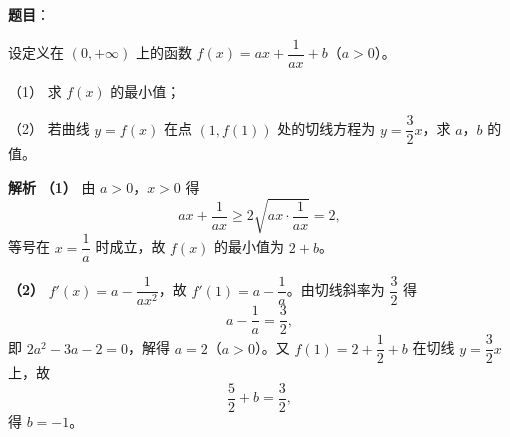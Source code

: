 \begin{answer}

\textbf{题目}：

设定义在 $(0,+\infty)$ 上的函数 $f(x)=ax+\dfrac1{ax}+b$（$a>0$）。

（1） 求 $f(x)$ 的最小值；

（2） 若曲线 $y=f(x)$ 在点 $(1,f(1))$ 处的切线方程为 $y=\dfrac32x$，求 $a$，$b$ 的值。

\textbf{解析}
\textbf{（1）} 由 $a>0$，$x>0$ 得
\nopagebreak[4]
\[ax+\frac1{ax}\geqslant2\sqrt{ax\cdot\frac1{ax}}=2,\]
等号在 $x=\dfrac1a$ 时成立，故 $f(x)$ 的最小值为 $2+b$。

\textbf{（2）} $f'(x)=a-\dfrac1{ax^2}$，故 $f'(1)=a-\dfrac1a$。由切线斜率为 $\dfrac32$ 得
\nopagebreak[4]
\[a-\frac1a=\frac32,\]
即 $2a^2-3a-2=0$，解得 $a=2$（$a>0$）。又 $f(1)=2+\dfrac12+b$ 在切线 $y=\dfrac32x$ 上，故
\nopagebreak[4]
\[\frac52+b=\frac32,\]
得 $b=-1$。



\end{answer}
